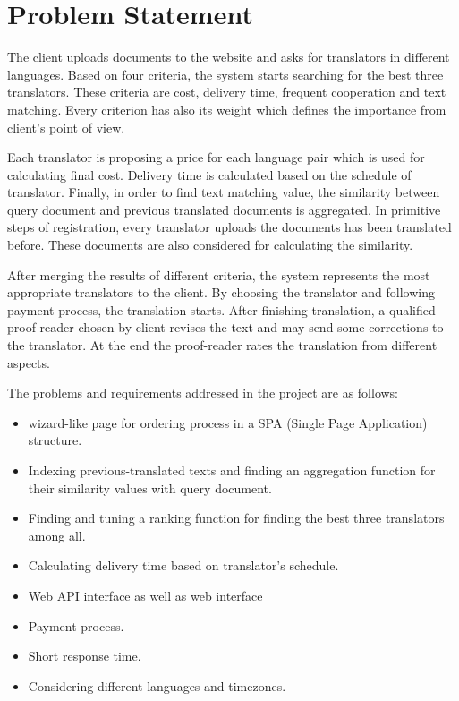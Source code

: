 \section{Problem Statement}
The client uploads documents to the website and asks for translators in different languages. Based on four criteria, the system starts searching for the best three translators. These criteria are cost, delivery time, frequent cooperation and text matching. Every criterion has also its weight which defines the importance from client’s point of view.

Each translator is proposing a price for each language pair which is used for calculating final cost. Delivery time is calculated based on the schedule of translator. Finally, in order to find text matching value, the similarity between query document and previous translated documents is aggregated. In primitive steps of registration, every translator uploads the documents has been translated before. These documents are also considered for calculating the similarity.

After merging the results of different criteria, the system represents the most appropriate translators to the client. By choosing the translator and following payment process, the translation starts. After finishing translation, a qualified proof-reader chosen by client revises the text and may send some corrections to the translator. At the end the proof-reader rates the translation from different aspects. 

The problems and requirements addressed in the project are as follows:
\begin{itemize}
	\item wizard-like page for ordering process in a SPA (Single Page Application) structure.
	\item Indexing previous-translated texts and finding an aggregation function for their similarity values with query document.
	\item Finding and tuning a ranking function for finding the best three translators among all.
	\item Calculating delivery time based on translator's schedule.
	\item Web API interface as well as web interface
	\item Payment process.
	\item Short response time.
	\item Considering different languages and timezones.
\end{itemize}